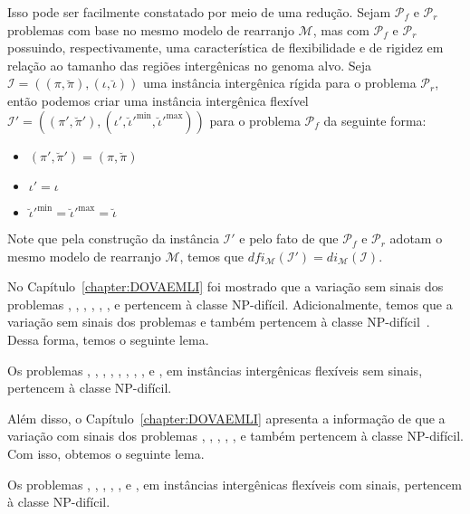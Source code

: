 Isso pode ser facilmente constatado por meio de uma redução. Sejam $\mathcal{P}_f$ e $\mathcal{P}_r$ problemas com base no mesmo modelo de rearranjo $\mathcal{M}$, mas com $\mathcal{P}_f$ e $\mathcal{P}_r$ possuindo, respectivamente, uma característica de flexibilidade e de rigidez em relação ao tamanho das regiões intergênicas no genoma alvo. Seja $\mathcal{I}=((\pi,\breve\pi),(\iota,\breve\iota))$ uma instância intergênica rígida para o problema $\mathcal{P}_r$, então podemos criar uma instância intergênica flexível $\mathcal{I'} = ((\pi',\breve\pi'),(\iota',\breve\iota'^{\min},\breve\iota'^{\max}))$ para o problema $\mathcal{P}_f$ da seguinte forma:

\begin{itemize}
  \item $(\pi',\breve\pi') = (\pi,\breve\pi)$
  \item $\iota' = \iota$
  \item $\breve\iota'^{\min} = \breve\iota'^{\max} = \breve\iota$
\end{itemize}

Note que pela construção da instância $\mathcal{I'}$ e pelo fato de que $\mathcal{P}_f$ e $\mathcal{P}_r$ adotam o mesmo modelo de rearranjo $\mathcal{M}$, temos que $dfi_{\mathcal{M}}(\mathcal{I'}) = di_{\mathcal{M}}(\mathcal{I})$.

No Capítulo~\ref{chapter:DOVAEMLI} foi mostrado que a variação sem sinais dos problemas \SbIR{}, \SbIRI{}, \SbIRM{}, \SbIRMI{}, \SbIRT{}, \SbIRTI{}, \SbIRTM{} e \SbIRTMI{} pertencem à classe NP-difícil. Adicionalmente, temos que a variação sem sinais dos problemas \SbIT{} e \SbITM{} também pertencem à classe NP-difícil~\cite{2021a-oliveira-etal}. Dessa forma, temos o seguinte lema.

\begin{lemma}\label{lemma:BEBGUYUB}
Os problemas \SbFIR{}, \SbFIRI{}, \SbFIRM{}, \SbFIRMI{}, \SbFIRT{}, \SbFIRTI{}, \SbFIRTM{}, \SbFIRTMI{}, \SbFIT{} e \SbFITM{}, em instâncias intergênicas flexíveis sem sinais, pertencem à classe NP-difícil.
\end{lemma}

Além disso, o Capítulo~\ref{chapter:DOVAEMLI} apresenta a informação de que a variação com sinais dos problemas \SbIR{}, \SbIRM{}, \SbIRMI{}, \SbIRT{}, \SbIRTI{}, \SbIRTM{} e \SbIRTMI{} também pertencem à classe NP-difícil. Com isso, obtemos o seguinte lema.

\begin{lemma}\label{lemma:XPRZJZES}
Os problemas \SbFIR{}, \SbFIRM{}, \SbFIRMI{}, \SbFIRT{}, \SbFIRTI{}, \SbFIRTM{} e \SbFIRTMI{}, em instâncias intergênicas flexíveis com sinais, pertencem à classe NP-difícil.
\end{lemma}

